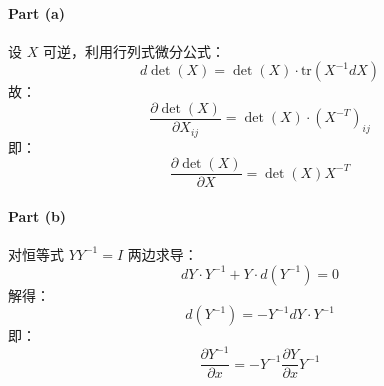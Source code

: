 \paragraph{Part (a)}  
设 \(X\) 可逆，利用行列式微分公式：
\[
d\det(X) = \det(X) \cdot \text{tr}(X^{-1} dX)
\]
故：
\[
\frac{\partial \det(X)}{\partial X_{ij}} = \det(X) \cdot (X^{-T})_{ij}
\]
即：
\[
\frac{\partial \det(X)}{\partial X} = \det(X) X^{-T}
\]

\paragraph{Part (b)}  
对恒等式 \(Y Y^{-1} = I\) 两边求导：
\[
dY \cdot Y^{-1} + Y \cdot d(Y^{-1}) = 0
\]
解得：
\[
d(Y^{-1}) = -Y^{-1} dY \cdot Y^{-1}
\]
即：
\[
\frac{\partial Y^{-1}}{\partial x} = -Y^{-1} \frac{\partial Y}{\partial x} Y^{-1}
\]